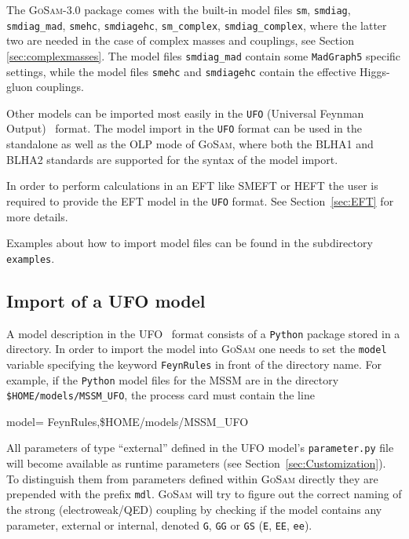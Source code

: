 \documentclass[11pt,a4paper]{refrep}
\newcommand{\gosamversion}{{3{.}0}}
\newcommand{\gosam}{\textsc{GoSam}\xspace}
\begin{document}
The \gosam{}-\gosamversion{} package comes with the built-in model files 
{\tt sm}, {\tt smdiag}, {\tt smdiag\_mad}, {\tt smehc}, {\tt smdiagehc},
{\tt sm\_complex}, {\tt smdiag\_complex}, 
where the latter two are needed in the case of complex masses and couplings, 
see Section \ref{sec:complexmasses}. 
The model files {\tt smdiag\_mad} contain some {\tt MadGraph5} specific settings, while
the model files {\tt smehc} and {\tt smdiagehc} contain the effective Higgs-gluon couplings.

Other models can be imported most easily in the {\tt UFO} (Universal Feynman Output)~\cite{Degrande:2011ua,Darme:2023jdn} format.
The model import in the {\tt UFO} format can be used in the standalone as well as the OLP 
mode of \gosam, where both the BLHA1 and BLHA2 standards are supported for the syntax of the model import.

In order to perform calculations in an EFT like SMEFT or HEFT the user is required to provide the EFT model in the {\tt UFO} format. See Section~\ref{sec:EFT} for more details.

Examples about how to import model files can be found in the subdirectory 
 \texttt{examples}.

\subsection{Import of a UFO model}\label{sec:UFO}
A model description in the UFO~\cite{Degrande:2011ua,Darme:2023jdn} format consists of a \texttt{Python} package
stored in a directory. In order to import the model into \gosam{} one needs
to set the \texttt{model} variable specifying the keyword \texttt{FeynRules}
in front of the directory name.
For example, if the \texttt{Python} model files for the MSSM are in 
 the directory \\
 \texttt{\$HOME/models/MSSM\_UFO}, the process card must contain the line
\begin{example}
model= FeynRules,\$HOME/models/MSSM\_UFO
\end{example}
All parameters of type ``external'' defined in the UFO model's \texttt{parameter.py} file will become available as runtime parameters (see Section~\ref{sec:Customization}). To distinguish them from parameters defined within \gosam directly they are prepended with the prefix \texttt{mdl}. \gosam will try to figure out the correct naming of the strong (electroweak/QED) coupling by checking if the model contains any parameter, external or internal, denoted \texttt{G}, \texttt{GG} or \texttt{GS} (\texttt{E}, \texttt{EE}, \texttt{ee}).
\end{document}
